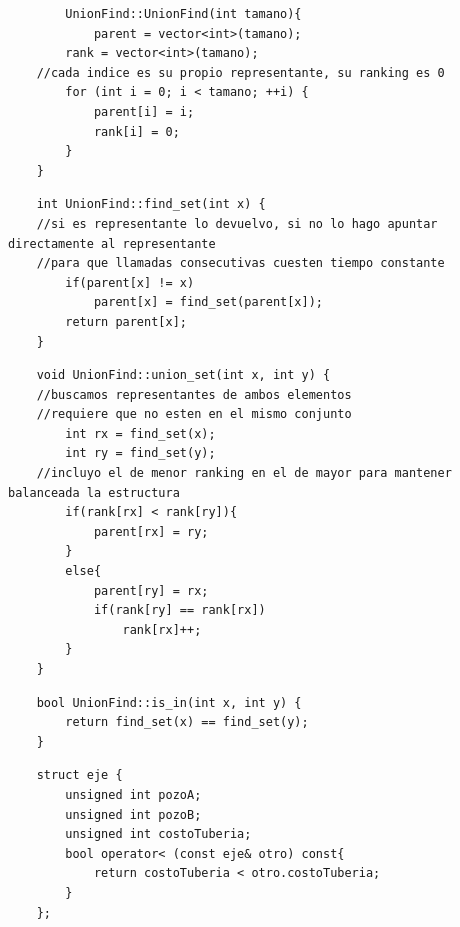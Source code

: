 	\begin{codesnippet}
	\begin{verbatim}
    	UnionFind::UnionFind(int tamano){
        	parent = vector<int>(tamano);
        rank = vector<int>(tamano);
    //cada indice es su propio representante, su ranking es 0
        for (int i = 0; i < tamano; ++i) {
            parent[i] = i;
            rank[i] = 0;
        }
    }
	\end{verbatim}
	\end{codesnippet}

	\begin{codesnippet}
	\begin{verbatim}
    int UnionFind::find_set(int x) {
    //si es representante lo devuelvo, si no lo hago apuntar directamente al representante
    //para que llamadas consecutivas cuesten tiempo constante
        if(parent[x] != x)
            parent[x] = find_set(parent[x]);
        return parent[x];
    }
	\end{verbatim}
	\end{codesnippet}

	\begin{codesnippet}
	\begin{verbatim}
    void UnionFind::union_set(int x, int y) {
    //buscamos representantes de ambos elementos
    //requiere que no esten en el mismo conjunto
        int rx = find_set(x);
        int ry = find_set(y);
    //incluyo el de menor ranking en el de mayor para mantener balanceada la estructura
        if(rank[rx] < rank[ry]){
            parent[rx] = ry;
        }
        else{
            parent[ry] = rx;
            if(rank[ry] == rank[rx])
                rank[rx]++;
        }
    }
	\end{verbatim}
	\end{codesnippet}

	\begin{codesnippet}
	\begin{verbatim}
    bool UnionFind::is_in(int x, int y) {
        return find_set(x) == find_set(y);
    }
	\end{verbatim}
	\end{codesnippet}

	\begin{codesnippet}
	\begin{verbatim}
    struct eje {
        unsigned int pozoA;
        unsigned int pozoB;
        unsigned int costoTuberia;
        bool operator< (const eje& otro) const{
            return costoTuberia < otro.costoTuberia;
        }
    };
	\end{verbatim}
	\end{codesnippet}


